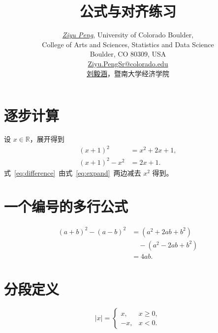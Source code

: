 \documentclass[UTF8,a4paper,fontset=fandol]{ctexart}
\title{公式与对齐练习}
\author{\href{https://github.com/pzy54154631-hub}{\textit{Ziyu Peng}}, University of Colorado Boulder,
  \\[0.1em]College of Arts and Sciences, Statistics and Data Science
  \\[0.1em]Boulder, CO 80309, USA
  \\[0.1em]\href{mailto:Ziyu.PengSr@colorado.edu}{Ziyu.PengSr@colorado.edu}
  \\[0.35em]
  \href{https://pzy54154631-hub.github.io/liuyihan/}{刘毅涵}，暨南大学经济学院}
\date{}
\begin{document}
\maketitle
\section{逐步计算}
设 \(x\in\mathbb{R}\)，展开得到
\begin{align}
  (x+1)^2 &= x^2+2x+1,\label{eq:expand}\\
  (x+1)^2-x^2 &= 2x+1.\label{eq:difference}
\end{align}
式~\eqref{eq:difference}~由式~\eqref{eq:expand}~两边减去
\(x^2\) 得到。

\section{一个编号的多行公式}
\begin{equation}
\begin{split}
  (a+b)^2-(a-b)^2
    &= (a^2+2ab+b^2)\\
    &\quad -(a^2-2ab+b^2)\\
    &= 4ab.
\end{split}
\end{equation}

\section{分段定义}
\[
|x|=\begin{cases}
  x,  & x\geq 0,\\
  -x, & x<0.
\end{cases}
\]
\end{document}
